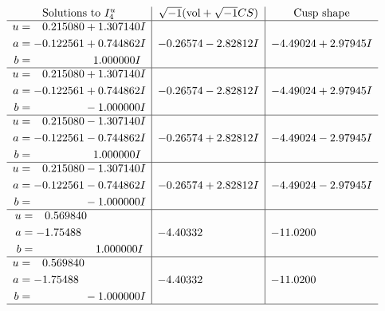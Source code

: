 \documentclass[1p]{elsarticle_modified}
\theoremstyle{definition}
\newcommand{\I}{\sqrt{-1}}
\begin{document}
$$\begin{array}{c|c|c}  
\text{Solutions to }I^u_{4}& \I (\text{vol} + \sqrt{-1}CS) & \text{Cusp shape}\\
 \hline 
\begin{aligned}
u &= \phantom{-}0.215080 + 1.307140 I \\
a &= -0.122561 + 0.744862 I \\
b &= \phantom{-0.000000 -}1.000000 I\end{aligned}
 & -0.26574 - 2.82812 I & -4.49024 + 2.97945 I \\ \hline\begin{aligned}
u &= \phantom{-}0.215080 + 1.307140 I \\
a &= -0.122561 + 0.744862 I \\
b &= \phantom{-0.000000 } -1.000000 I\end{aligned}
 & -0.26574 - 2.82812 I & -4.49024 + 2.97945 I \\ \hline\begin{aligned}
u &= \phantom{-}0.215080 - 1.307140 I \\
a &= -0.122561 - 0.744862 I \\
b &= \phantom{-0.000000 -}1.000000 I\end{aligned}
 & -0.26574 + 2.82812 I & -4.49024 - 2.97945 I \\ \hline\begin{aligned}
u &= \phantom{-}0.215080 - 1.307140 I \\
a &= -0.122561 - 0.744862 I \\
b &= \phantom{-0.000000 } -1.000000 I\end{aligned}
 & -0.26574 + 2.82812 I & -4.49024 - 2.97945 I \\ \hline\begin{aligned}
u &= \phantom{-}0.569840\phantom{ +0.000000I} \\
a &= -1.75488\phantom{ +0.000000I} \\
b &= \phantom{-0.000000 -}1.000000 I\end{aligned}
 & -4.40332\phantom{ +0.000000I} & -11.0200\phantom{ +0.000000I} \\ \hline\begin{aligned}
u &= \phantom{-}0.569840\phantom{ +0.000000I} \\
a &= -1.75488\phantom{ +0.000000I} \\
b &= \phantom{-0.000000 } -1.000000 I\end{aligned}
 & -4.40332\phantom{ +0.000000I} & -11.0200\phantom{ +0.000000I}\\
 \hline 
 \end{array}$$\newpage
\end{document}
